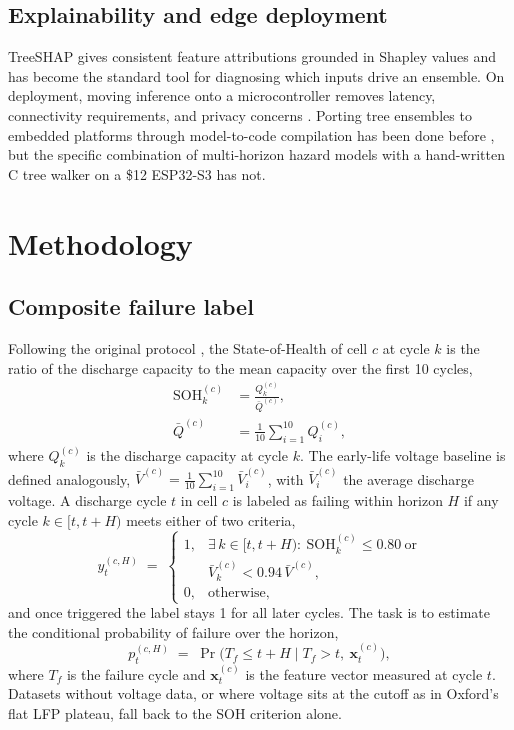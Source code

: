 \documentclass[journal]{IEEEtran}
\begin{document}
\subsection{Explainability and edge deployment}
TreeSHAP \cite{lundberg2020from} gives consistent feature attributions grounded in Shapley values and has become the standard tool for diagnosing which inputs drive an ensemble. On deployment, moving inference onto a microcontroller removes latency, connectivity requirements, and privacy concerns \cite{grzesik2024combining}. Porting tree ensembles to embedded platforms through model-to-code compilation has been done before \cite{gupta2023online}, but the specific combination of multi-horizon hazard models with a hand-written C tree walker on a \$12 ESP32-S3 has not.

\section{Methodology}

\subsection{Composite failure label}
Following the original protocol \cite{shikdar2026learning}, the State-of-Health of cell $c$ at cycle $k$ is the ratio of the discharge capacity to the mean capacity over the first 10 cycles,
\begin{equation}\label{eq:soh}
\begin{aligned}
\mathrm{SOH}_k^{(c)} &= \frac{Q_k^{(c)}}{\bar{Q}^{(c)}},\\[2pt]
\bar{Q}^{(c)} &= \frac{1}{10}\sum_{i=1}^{10} Q_i^{(c)},
\end{aligned}
\end{equation}
where $Q_k^{(c)}$ is the discharge capacity at cycle $k$. The early-life voltage baseline is defined analogously, $\bar{V}^{(c)}=\frac{1}{10}\sum_{i=1}^{10}\bar{V}_i^{(c)}$, with $\bar{V}_i^{(c)}$ the average discharge voltage. A discharge cycle $t$ in cell $c$ is labeled as failing within horizon $H$ if any cycle $k\in[t,t{+}H)$ meets either of two criteria,
\begin{equation}\label{eq:label}
y_t^{(c,H)} \;=\; \begin{cases}
1, & \exists\, k\in[t,t{+}H):\ \mathrm{SOH}_k^{(c)}\le 0.80 \ \text{or}\\[2pt]
& \bar{V}_k^{(c)} < 0.94\,\bar{V}^{(c)},\\[2pt]
0, & \text{otherwise,}
\end{cases}
\end{equation}
and once triggered the label stays 1 for all later cycles. The task is to estimate the conditional probability of failure over the horizon,
\begin{equation}\label{eq:hazard}
p_t^{(c,H)} \;=\; \Pr\!\bigl(T_f \le t{+}H \mid T_f > t,\ \mathbf{x}_t^{(c)}\bigr),
\end{equation}
where $T_f$ is the failure cycle and $\mathbf{x}_t^{(c)}$ is the feature vector measured at cycle $t$. Datasets without voltage data, or where voltage sits at the cutoff as in Oxford's flat LFP plateau, fall back to the SOH criterion alone.
\end{document}
